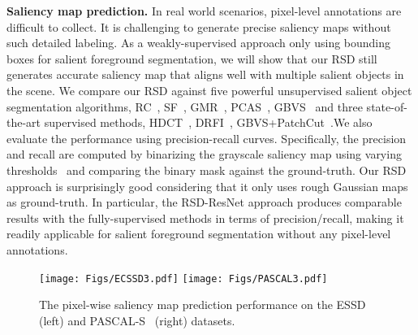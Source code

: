 \documentclass[10pt,twocolumn,letterpaper]{article}
\begin{document}
{\flushleft \textbf{Saliency map prediction.}} {In real world scenarios, pixel-level annotations are difficult to collect. It is challenging to generate precise saliency maps without such detailed labeling.} As a weakly-supervised approach only using bounding boxes for salient foreground segmentation, we will show that our RSD still generates accurate saliency map that aligns well with multiple salient objects in the scene. We compare our RSD against five powerful unsupervised salient object
segmentation algorithms, RC~\cite{rc}, SF~\cite{perazzi2012saliency}, GMR~\cite{yang2013saliency}, 
PCAS~\cite{zhang2008sun},
GBVS~\cite{harel2006graph} and three state-of-the-art supervised methods,
HDCT~\cite{kim2014salient},
DRFI~\cite{jiang2013salient},
GBVS+PatchCut~\cite{yang2015patchcut}.We also evaluate the performance using precision-recall curves. Specifically, the precision and recall are computed by binarizing the grayscale saliency map using varying thresholds~\cite{achanta2009frequency,perazzi2012saliency,yang2013saliency,hs} and comparing the binary mask against the ground-truth.
%
Our RSD approach is surprisingly good considering that it only uses rough Gaussian maps as ground-truth. In particular, the RSD-ResNet approach produces comparable results with the fully-supervised methods in terms of precision/recall, making it readily applicable for salient foreground segmentation without any pixel-level annotations.
\begin{figure}
    \centering
    \texttt{[image: Figs/ECSSD3.pdf]}
    \texttt{[image: Figs/PASCAL3.pdf]}
 	\caption{The pixel-wise saliency map prediction performance on the ESSD~\cite{hs} (left) and PASCAL-S~\cite{li2014secrets} (right) datasets.}
    \label{fig:saliency_map}
\end{figure}
\end{document}
